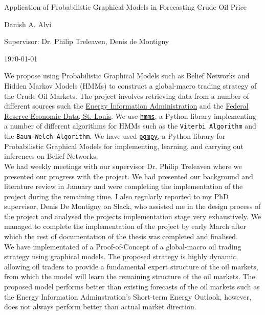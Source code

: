 \documentclass[a4paper]{article}
\begin{document}

\Large
 \begin{center}
Application of Probabilistic Graphical Models in Forecasting Crude Oil Price\\ 

\hspace{10pt}

\large
Danish A. Alvi \\

\hspace{10pt}

\large
Supervisor: Dr. Philip Treleaven, Denis de Montigny \\

\hspace{10pt}

\today

\hspace{10pt}

\end{center}

\hspace{10pt}

\normalsize
We propose using Probabilistic Graphical Models such as Belief Networks and Hidden Markov Models (HMMs) to construct a global-macro trading strategy of the Crude Oil Markets. The project involves retrieving data from a number of different sources such the \href{https://www.eia.gov/}{Energy Information Administration} and the \href{https://fred.stlouisfed.org/}{Federal Reserve Economic Data, St. Louis}. We use \href{https://github.com/lopatovsky/HMMs}{\texttt{hmms}}, a Python library implementing a number of different algorithms for HMMs such as the \texttt{Viterbi Algorithm} and the \texttt{Baum-Welch Algorithm}. We have used \href{https://github.com/pgmpy/pgmpy}{\texttt{pgmpy}}, a Python library for Probabilistic Graphical Models for implementing, learning, and carrying out inferences on Belief Networks. \\

We had weekly meetings with our supervisor Dr. Philip Treleaven where we presented our progress with the project. We had presented our background and literature review in January and were completing the implementation of the project during the remaining time. I also regularly reported to my PhD supervisor, Denis De Montigny on Slack, who assisted me in the design process of the project and analysed the projects implementation stage very exhaustively. We managed to complete the implementation of the project by early March after which the rest of documentation of the thesis was completed and finalised.\\

We have implementated of a Proof-of-Concept of a global-macro oil trading strategy using graphical models. The proposed strategy is highly dynamic, allowing oil traders to provide a fundamental expert structure of the oil markets, from which the model will learn the remaining structure of the oil markets. The proposed model performs better than existing forecasts of the oil markets such as the Energy Information Adminstration's Short-term Energy Outlook, however, does not always perform better than actual market direction.
\end{document}
